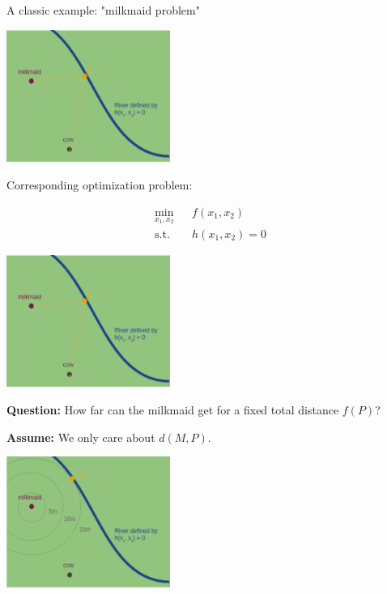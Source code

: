 \documentclass[11pt,compress,t,notes=noshow, xcolor=table]{beamer}
\begin{document}
\begin{vbframe}{A classic example: "milkmaid problem"}
\medskip

\begin{center}
	\includegraphics[width=0.4\textwidth]{figure_man/milkmaid2.png}
\end{center}


\framebreak 

Corresponding optimization problem:

\vspace{-\baselineskip}

\begin{eqnarray*}
	\min_{x_1, x_2} && f(x_1, x_2) \\
	\text{s.t.} && h(x_1, x_2) = 0
\end{eqnarray*}

\medskip

\begin{center}
	\includegraphics[width=0.4\textwidth]{figure_man/milkmaid2.png}
\end{center}

\framebreak 

\textbf{Question:} How far can the milkmaid get for a fixed total distance $f(P)$?

\medskip

\textbf{Assume:} We only care about $d(M,P)$.

\begin{center}
	\includegraphics[width=0.4\textwidth]{figure_man/milkmaid3.png}
\end{center}


\end{vbframe}
\end{document}

